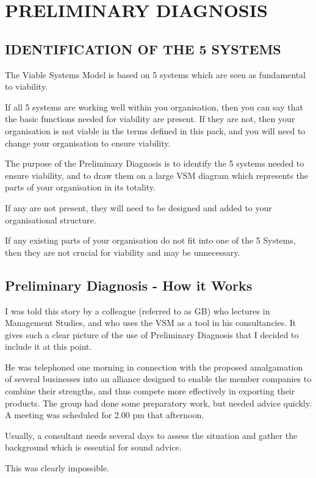 \chapter{PRELIMINARY DIAGNOSIS}\label{PRELIMINARY DIAGNOSIS}

\section*{IDENTIFICATION OF THE 5 SYSTEMS}
The Viable Systems Model is based on 5 systems which are seen as fundamental to viability.

If all 5 systems are working well within you organisation, then you can say that the basic functions needed for viability are present. If they are not, then your organisation is not viable in the terms defined in this pack, and you will need to change your organisation to ensure viability.

The purpose of the Preliminary Diagnosis is to identify the 5 systems needed to ensure viability, and to draw them on a large VSM diagram which represents the parts of your organisation in its totality.

If any are not present, they will need to be designed and added to your organisational structure.

If any existing parts of your organisation do not fit into one of the 5 Systems, then they are not crucial for viability and may be unnecessary.

\section*{Preliminary Diagnosis - How it Works}
I was told this story by a colleague (referred to as GB) who lectures in Management Studies, and who uses the VSM as a tool in his consultancies. It gives such a clear picture of the use of Preliminary Diagnosis that I decided to include it at this point.

He was telephoned one morning in connection with the proposed amalgamation of several businesses into an alliance designed to enable the member companies to combine their strengths, and thus compete more effectively in exporting their products. The group had done some preparatory work, but needed advice quickly. A meeting was scheduled for 2.00 pm that afternoon.

Usually, a consultant needs several days to assess the situation and gather the background which is essential for sound advice.

This was clearly impossible.

